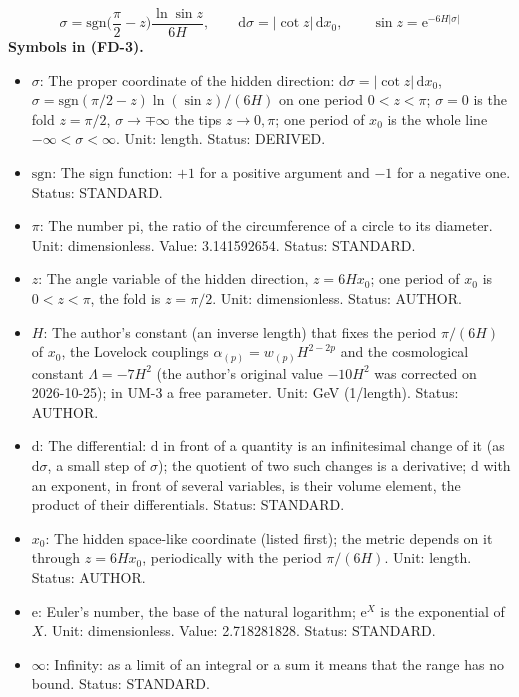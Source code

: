 \documentclass[
  10pt,
]{article}
\providecommand{\tightlist}{%
  \setlength{\itemsep}{0pt}\setlength{\parskip}{0pt}}
\begin{document}
\[
\sigma = \mathrm{sgn}\Big(\frac{\pi}{2} - z\Big)\frac{\ln\sin z}{6H},\qquad \mathrm{d}\sigma = \lvert\cot z\rvert\,\mathrm{d}x_0,\qquad
\sin z = \mathrm{e}^{-6H\lvert\sigma\rvert} \tag{FD-3}
\] \textbf{Symbols in (FD-3).}

\begin{itemize}
\tightlist
\item
  \(\sigma\): The proper coordinate of the hidden direction:
  \(\mathrm{d}\sigma = \lvert\cot z\rvert\,\mathrm{d}x_0\),
  \(\sigma = \mathrm{sgn}(\pi/2 - z)\ln(\sin z)/(6H)\) on one period
  \(0 < z < \pi\); \(\sigma = 0\) is the fold \(z = \pi/2\),
  \(\sigma \to \mp\infty\) the tips \(z \to 0, \pi\); one period of
  \(x_0\) is the whole line \(-\infty < \sigma < \infty\). Unit: length.
  Status: DERIVED.
\item
  \(\mathrm{sgn}\): The sign function: \(+1\) for a positive argument
  and \(-1\) for a negative one. Status: STANDARD.
\item
  \(\pi\): The number pi, the ratio of the circumference of a circle to
  its diameter. Unit: dimensionless. Value: 3.141592654. Status:
  STANDARD.
\item
  \(z\): The angle variable of the hidden direction, \(z = 6Hx_0\); one
  period of \(x_0\) is \(0 < z < \pi\), the fold is \(z = \pi/2\). Unit:
  dimensionless. Status: AUTHOR.
\item
  \(H\): The author's constant (an inverse length) that fixes the period
  \(\pi/(6H)\) of \(x_0\), the Lovelock couplings
  \(\alpha_{(p)} = w_{(p)}H^{2-2p}\) and the cosmological constant
  \(\Lambda = -7H^2\) (the author's original value \(-10H^2\) was
  corrected on 2026-10-25); in UM-3 a free parameter. Unit: GeV
  (1/length). Status: AUTHOR.
\item
  \(\mathrm{d}\): The differential: \(\mathrm{d}\) in front of a
  quantity is an infinitesimal change of it (as \(\mathrm{d}\sigma\), a
  small step of \(\sigma\)); the quotient of two such changes is a
  derivative; \(\mathrm{d}\) with an exponent, in front of several
  variables, is their volume element, the product of their
  differentials. Status: STANDARD.
\item
  \(x_0\): The hidden space-like coordinate (listed first); the metric
  depends on it through \(z = 6Hx_0\), periodically with the period
  \(\pi/(6H)\). Unit: length. Status: AUTHOR.
\item
  \(\mathrm{e}\): Euler's number, the base of the natural logarithm;
  \(\mathrm{e}^{X}\) is the exponential of \(X\). Unit: dimensionless.
  Value: 2.718281828. Status: STANDARD.
\item
  \(\infty\): Infinity: as a limit of an integral or a sum it means that
  the range has no bound. Status: STANDARD.
\end{itemize}
\end{document}

